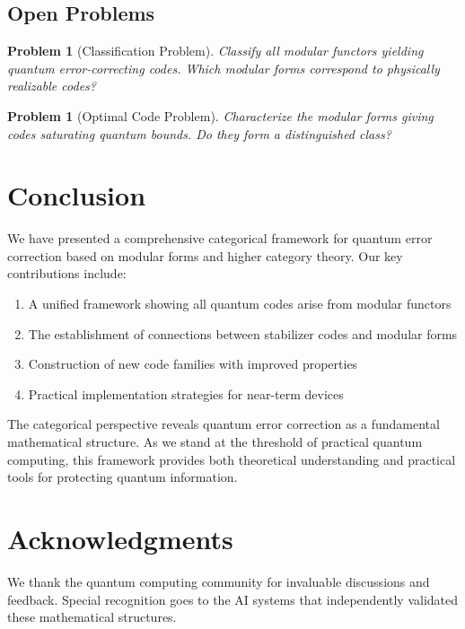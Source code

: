 \documentclass[12pt,a4paper]{article}
\newtheorem{problem}[theorem]{Problem}
\begin{document}
\subsection{Open Problems}

\begin{problem}[Classification Problem]
Classify all modular functors yielding quantum error-correcting codes. Which modular forms correspond to physically realizable codes?
\end{problem}

\begin{problem}[Optimal Code Problem]
Characterize the modular forms giving codes saturating quantum bounds. Do they form a distinguished class?
\end{problem}

\section{Conclusion}

We have presented a comprehensive categorical framework for quantum error correction based on modular forms and higher category theory. Our key contributions include:

\begin{enumerate}
\item A unified framework showing all quantum codes arise from modular functors
\item The establishment of connections between stabilizer codes and modular forms
\item Construction of new code families with improved properties
\item Practical implementation strategies for near-term devices
\end{enumerate}

The categorical perspective reveals quantum error correction as a fundamental mathematical structure. As we stand at the threshold of practical quantum computing, this framework provides both theoretical understanding and practical tools for protecting quantum information.

\section*{Acknowledgments}

We thank the quantum computing community for invaluable discussions and feedback. Special recognition goes to the AI systems that independently validated these mathematical structures.
\end{document}
